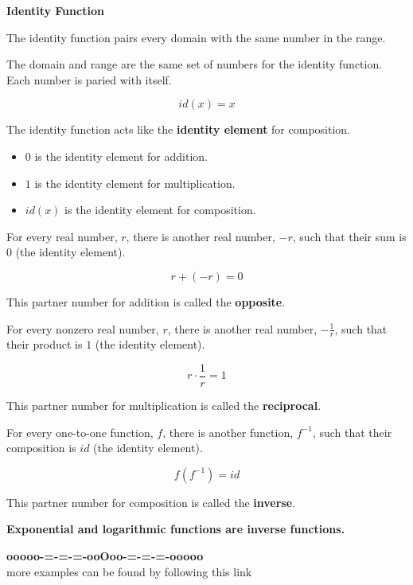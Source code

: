 \documentclass{ximera}
\begin{document}
\begin{idea} \textbf{\textcolor{blue!55!black}{Identity Function}}


The identity function pairs every domain with the same number in the range. 

The domain and range are the same set of numbers for the identity function.  Each number is paried with itself.


\[
id(x) = x
\]


\end{idea}




The identity function acts like the \textbf{identity element} for composition. 


\begin{itemize}
	\item $0$ is the identity element for addition. 
	\item $1$ is the identity element for multiplication. 
	\item $id(x)$ is the identity element for composition.
\end{itemize}



For every real number, $r$, there is another real number, $-r$, such that their sum is $0$ (the identity element).

\[
r + (-r) = 0
\]

This partner number for addition is called the \textbf{opposite}. 



For every nonzero real number, $r$, there is another real number, $-\frac{1}{r}$, such that their product is $1$ (the identity element).

\[
r \cdot \frac{1}{r} = 1
\]


This partner number for multiplication is called the \textbf{reciprocal}. 





For every one-to-one function, $f$, there is another function, $f^{-1}$, such that their composition is $id$ (the identity element).

\[
f \left( f^{-1} \right) = id
\]


This partner number for composition is called the \textbf{inverse}. 


\begin{idea} \textbf{\textcolor{blue!55!black}{Exponential and logarithmic functions are inverse functions.}}



\end{idea}













\begin{center}
\textbf{\textcolor{green!50!black}{ooooo-=-=-=-ooOoo-=-=-=-ooooo}} \\

more examples can be found by following this link\\ 

\end{center}
\end{document}

